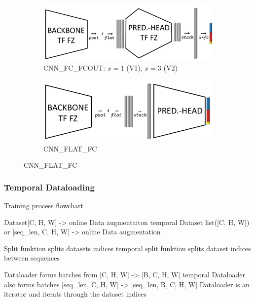 \begin{figure}[htbp]
    \vspace{0.5cm} %

    \begin{subfigure}[b]{0.48\textwidth}
        \centering
        \includegraphics[width=\textwidth]{PICs/temporalModels/CNN_FC_FCOUT_V1_V2.jpg}
        \caption{CNN\_FC\_FCOUT: $x=1$ (V1), $x=3$ (V2)}
    \end{subfigure}
    \hfill
    \begin{subfigure}[b]{0.48\textwidth}
        \centering
        \includegraphics[width=\textwidth]{PICs/temporalModels/CNN_FLAT_FC.jpg}
        \caption{CNN\_FLAT\_FC}
    \end{subfigure}
\end{figure}


\subsubsection{Temporal Dataloading}

Training process flowchart

Dataset[C, H, W] -> online Data augmentaiton
temporal Dataset list([C, H, W]) or [seq\_len, C, H, W] -> online Data augmentation 

Split funktion splits datasets indices
temporal split funktion splits dataset indices between sequences

Dataloader forms batches from [C, H, W] -> [B, C, H, W]
temporal Dataloader also forms batches [seq\_len, C, H, W] -> [seq\_len, B, C, H, W]
Dataloader is an iterator and iterats through the dataset indices

